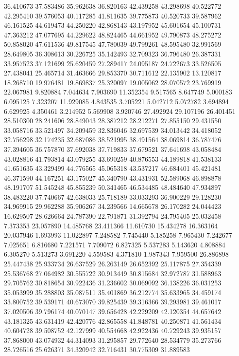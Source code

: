 36.410673
37.583486
35.962638
36.820163
42.439258
43.298698
40.522772
42.295410
39.576053
40.117285
41.811635
39.775873
40.520733
39.587962
46.161525
44.619473
44.250220
42.868143
43.197952
45.601654
45.100731
47.363212
47.077695
44.229622
48.824465
44.661952
49.790873
48.275272
50.858020
47.611536
49.817545
47.780039
49.799261
48.595480
32.991569
28.649805
36.308613
30.226725
35.142493
32.709323
36.796480
26.387331
33.957523
37.121699
25.620459
27.289417
24.095187
24.722673
33.526505
27.438041
25.465714
31.463666
29.853370
30.711612
22.135902
13.120817
18.268710
19.976481
19.869837
25.320097
19.005062
28.070572
23.769919
22.067981
9.820884
7.044634
7.903690
11.352354
9.517565
8.647749
5.000183
6.095125
7.323207
11.929085
4.843535
3.705221
5.042712
5.072782
3.694894
6.629925
4.350461
3.214952
5.569908
3.920746
27.492924
29.107196
26.401451
28.510300
28.241606
28.849043
28.387212
28.212271
27.855150
29.431550
33.058716
33.521497
34.209459
32.836046
32.697539
34.013442
34.418052
32.756298
32.174235
32.687086
38.521995
38.491564
38.069814
36.787476
37.394605
36.757870
37.692038
37.719833
37.679521
37.641698
43.058484
43.028816
41.793814
43.079255
43.690259
40.876553
44.189818
41.538133
41.651635
43.329499
44.776565
45.065318
43.537217
46.684401
45.421481
46.371590
44.167251
43.175027
45.340790
43.431931
52.589068
46.898878
48.191707
51.545248
45.855239
50.341465
46.534485
48.484640
47.934897
38.483220
37.740667
42.638033
25.718189
33.033293
36.900229
29.128230
34.969915
29.962288
35.906267
34.239566
14.665678
26.170282
24.044423
16.629507
28.626664
24.787390
22.791871
31.392794
24.795405
25.032458
7.373353
23.057890
14.485768
23.411366
11.610730
15.434278
16.363164
20.037946
1.693993
11.022897
7.248582
7.745440
5.185258
7.965430
7.242677
7.025651
6.816680
7.221571
7.709072
6.827325
5.537283
5.143620
4.808884
6.305270
5.513273
3.691220
4.559583
4.371810
1.987343
7.959500
26.886898
25.447438
25.933734
26.637529
26.263149
26.652392
25.117875
27.354339
25.536768
27.064982
30.555722
30.913449
30.815684
32.972787
31.588963
29.705762
30.818654
30.922436
31.236602
30.069092
36.138226
36.031253
35.053999
35.288803
35.087511
35.401869
36.212774
35.633965
34.459174
33.800752
39.539171
40.673070
39.825439
39.316366
39.293981
39.461017
37.020506
39.796174
40.070147
39.656428
42.229209
42.120354
44.657642
43.181325
43.631419
42.420776
42.865558
41.848781
40.250871
41.561434
40.604728
39.508752
42.127999
40.554668
42.922436
40.729243
39.935157
37.868000
43.074932
44.314093
31.295857
29.772640
28.534779
35.273766
28.726516
25.626371
34.320942
32.716431
30.775309
31.889583
